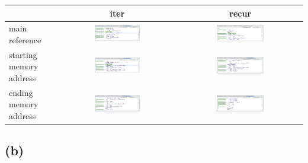 \documentclass[12pt]{article}
\begin{document}
\begin{table}[H]
    \centering
    \begin{tabular}{|p{2cm}|c|c|}
    \hline
    & \textbf{iter} & \textbf{recur} \\
    \hline
    main reference & \includegraphics[width=0.4\textwidth]{img/iter_reference.png} & \includegraphics[width=0.4\textwidth]{img/recur_reference.png} \\
    \hline
    starting memory address & \includegraphics[width=0.4\textwidth]{img/iter_start.png} & \includegraphics[width=0.4\textwidth]{img/recur_start.png} \\
    \hline
    ending memory address & \includegraphics[width=0.4\textwidth]{img/iter_end.png} & \includegraphics[width=0.4\textwidth]{img/recur_end.png} \\
    \hline
    \end{tabular}
\end{table}

\subsection*{(b)}
\end{document}
